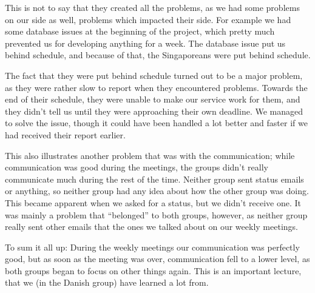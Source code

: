 This is not to say that they created all the problems, as we had some problems on our side as well, problems which impacted their side. For example we had some database issues at the beginning of the project, which pretty much prevented us for developing anything for a week. The database issue put us behind schedule, and because of that, the Singaporeans were put behind schedule.

The fact that they were put behind schedule turned out to be a major problem, as they were rather slow to report when they encountered problems. Towards the end of their schedule, they were unable to make our service work for them, and they didn't tell us until they were approaching their own deadline. We managed to solve the issue, though it could have been handled a lot better and faster if we had received their report earlier. 

This also illustrates another problem that was with the communication; while communication was good during the meetings, the groups didn't really communicate much during the rest of the time. Neither group sent status emails or anything, so neither group had any idea about how the other group was doing. This became apparent when we asked for a status, but we didn't receive one. It was mainly a problem that ``belonged'' to both groups, however, as neither group really sent other emails that the ones we talked about on our weekly meetings.

To sum it all up: During the weekly meetings our communication was perfectly good, but as soon as the meeting was over, communication fell to a lower level, as both groups began to focus on other things again. This is an important lecture, that we (in the Danish group) have learned a lot from.